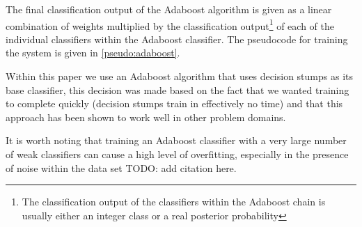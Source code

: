 \documentclass[ %
                    author={Sam Phippen},
                supervisor={Dr. Rafal Bogacz},
                     title={Real time voice activity detectors in noisy personal computing environments},
                  subtitle={},
                    degree={MEng},
                      year={2012} ]{thesis}
\begin{document}
The final classification output of the Adaboost algorithm is given as a linear
combination of weights multiplied by the classification output\footnote{The
    classification output of the classifiers within the Adaboost chain is
usually either an integer class or a real posterior probability} of each of
the individual classifiers within the Adaboost classifier. The pseudocode
for training the system is given in \ref{pseudo:adaboost}.

Within this paper we use an Adaboost algorithm that uses decision stumps as its
base classifier, this decision was made based on the fact that we wanted
training to complete quickly (decision stumps train in effectively no time) and
that this approach has been shown to work well in other problem
domains\cite{viola}.

It is worth noting that training an Adaboost classifier with a very large
number of weak classifiers can cause a high level of overfitting, especially
in the presence of noise within the data set TODO: add citation here.
\end{document}
